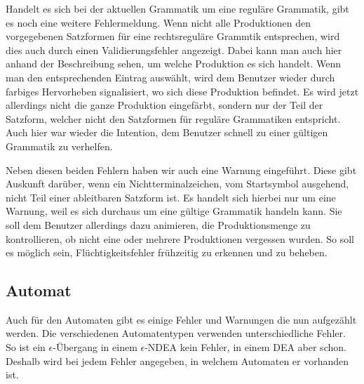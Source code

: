 Handelt es sich bei der aktuellen Grammatik um eine reguläre Grammatik, gibt es
noch eine weitere Fehlermeldung. Wenn nicht alle Produktionen den vorgegebenen
Satzformen für eine rechtsreguläre Grammtik entsprechen, wird dies auch durch
einen Validierungsfehler angezeigt. Dabei kann man auch hier anhand der
Beschreibung sehen, um welche Produktion es sich handelt. Wenn man den
entsprechenden Eintrag auswählt, wird dem Benutzer wieder durch farbiges
Hervorheben signalisiert, wo sich diese Produktion befindet. Es wird jetzt
allerdings nicht die ganze Produktion eingefärbt, sondern nur der Teil der
Satzform, welcher nicht den Satzformen für reguläre Grammatiken entspricht. Auch
hier war wieder die Intention, dem Benutzer schnell zu einer gültigen Grammatik
zu verhelfen.\vspace{10pt}

Neben diesen beiden Fehlern haben wir auch eine Warnung eingeführt. Diese gibt
Auskunft darüber, wenn ein Nichtterminalzeichen, vom Startsymbol ausgehend, nicht
Teil einer ableitbaren Satzform ist. Es handelt sich hierbei nur um eine Warnung,
weil es sich durchaus um eine gültige Grammatik handeln kann. Sie soll dem
Benutzer allerdings dazu animieren, die Produktionsmenge zu kontrollieren, ob
nicht eine oder mehrere Produktionen vergessen wurden. So soll es möglich sein,
Flüchtig\-keits\-fehler frühzeitig zu erkennen und zu beheben.\vspace{10pt}

\subsection{Automat}\label{InteractionMachine}

Auch für den Automaten gibt es einige Fehler und Warnungen die nun aufgezählt
werden. Die verschiedenen Automatentypen verwenden unterschiedliche Fehler. So
ist ein $\epsilon$-Übergang in einem $\epsilon$-NDEA kein Fehler, in einem DEA
aber schon. Deshalb wird bei jedem Fehler angegeben, in welchem Automaten er
vorhanden ist.\vspace{10pt}

